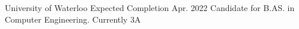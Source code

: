 

\begin{cventries}

  \cventry
    {University of Waterloo} %
    {} %
    {} %
    {Expected Completion Apr. 2022} %
    {Candidate for B.AS. in Computer Engineering. Currently 3A}

\end{cventries}
